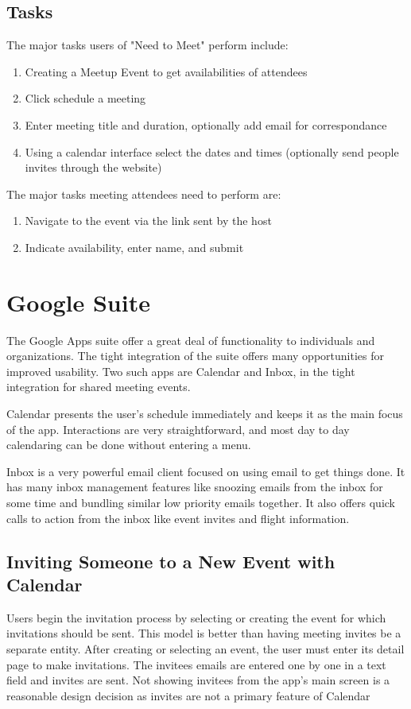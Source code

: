 \documentclass{sigchi}
\begin{document}
\subsection{Tasks}
The major tasks users of "Need to Meet" perform include: 
\begin{enumerate}
\item Creating a Meetup Event to get availabilities of attendees
\item Click schedule a meeting
\item Enter meeting title and duration, optionally add email for correspondance
\item Using a calendar interface select the dates and times (optionally 
send people invites through the website)
\end{enumerate}
The major tasks meeting attendees need to perform are: 
\begin{enumerate}
\item Navigate to the event via the link sent by the host
\item Indicate availability, enter name, and submit
\end{enumerate}

\section{Google Suite}
The Google Apps suite offer a great deal of functionality to individuals and organizations.
The tight integration of the suite offers many opportunities for improved usability.
Two such apps are Calendar and Inbox, in the tight integration for shared meeting events. 

Calendar presents the user's schedule immediately and keeps it as the main focus of the app.
Interactions are very straightforward, and most day to day calendaring can be done without entering a menu.

Inbox is a very powerful email client focused on using email to get things done.
It has many inbox management features like snoozing emails from the inbox for some time and bundling similar low priority emails together.
It also offers quick calls to action from the inbox like event invites and flight information.

\subsection{Inviting Someone to a New Event with Calendar}
Users begin the invitation process by selecting or creating the event for which invitations should be sent.
This model is better than having meeting invites be a separate entity.
After creating or selecting an event, the user must enter its detail page to make invitations.
The invitees emails are entered one by one in a text field and invites are sent.
Not showing invitees from the app's main screen is a reasonable design decision as invites are not a primary feature of Calendar
\end{document}
